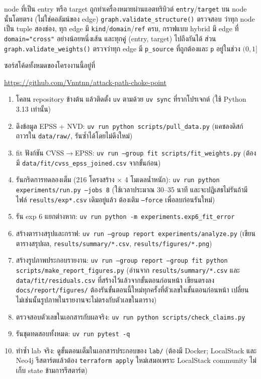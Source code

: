 \newpage
node ที่เป็น entry หรือ target ถูกทำเครื่องหมายผ่านแอตทริบิวต์ \texttt{entry}/\texttt{target}
บน node นั้นโดยตรง (ไม่ใช่คอลัมน์ของ edge) \texttt{graph.validate\_structure()} ตรวจสอบ
ว่าทุก node เป็น tuple สองช่อง, ทุก edge มี \texttt{kind}/\texttt{domain}/\texttt{ref} ครบ,
กราฟแบบ hybrid มี edge ที่ \texttt{domain="cross"} อย่างน้อยหนึ่งเส้น และทุกคู่
(entry, target) ไปถึงกันได้ ส่วน \texttt{graph.validate\_weights()} ตรวจว่าทุก edge มี
\texttt{p\_source} ที่ถูกต้องและ \texttt{p} อยู่ในช่วง $(0,1]$


ซอร์สโค้ดทั้งหมดของโครงงานนี้อยู่ที่

\begin{center}\scriptsize
\url{https://github.com/Vnntnn/attack-path-choke-point}
\end{center}

\begin{enumerate}[leftmargin=1.6em]
\item โคลน repository ข้างต้น แล้วติดตั้ง \texttt{uv} ตามด้วย \texttt{uv sync} ที่รากโปรเจกต์ (ใช้ Python 3.13 เท่านั้น)
\item ดึงข้อมูล EPSS + NVD: \texttt{uv run python scripts/pull\_data.py} (แคชลงดิสก์
ถาวรใน \texttt{data/raw/}, รันซ้ำได้โดยไม่ดึงใหม่)
\item fit ฟังก์ชัน CVSS$\to$EPSS: \texttt{uv run --group fit scripts/fit\_weights.py}
(ต้องมี \texttt{data/fit/cvss\_epss\_joined.csv} จากขั้นก่อน)
\item รันกริดการทดลองเต็ม (216 โครงสร้าง $\times$ 4 โมเดลน้ำหนัก):
\texttt{uv run python experiments/run.py --jobs 8} (ใช้เวลาประมาณ 30--35 นาที
และจะปฏิเสธไม่รันถ้ามีไฟล์ \texttt{results/exp*.csv} เดิมอยู่แล้ว ต้องเติม
\texttt{--force} เพื่อลบก่อนรันใหม่)
\item รัน exp 6 แยกต่างหาก: \texttt{uv run python -m experiments.exp6\_fit\_error}
\item สร้างตารางสรุปและกราฟ: \texttt{uv run --group report experiments/analyze.py}
(เขียนตารางสรุปผล, \texttt{results/summary/*.csv},
\texttt{results/figures/*.png})
\item สร้างรูปภาพประกอบรายงาน: \texttt{uv run --group report --group fit
python scripts/make\_report\_figures.py} (อ่านจาก \texttt{results/summary/*.csv}
และ \texttt{data/fit/residuals.csv} ที่สร้างไว้แล้วจากขั้นตอนก่อนหน้า เขียนตรงลง
\texttt{docs/report/figures/} ต้องรันขั้นตอนนี้ใหม่ทุกครั้งที่ตัวเลขในขั้นตอนก่อนหน้า
เปลี่ยน ไม่เช่นนั้นรูปภาพในรายงานจะไม่ตรงกับตัวเลขในตาราง)
\item ตรวจสอบตัวเลขในเอกสารกับผลจริง: \texttt{uv run python scripts/check\_claims.py}
\item รันชุดทดสอบทั้งหมด: \texttt{uv run pytest -q}
\item ทำซ้ำ lab จริง: ดูขั้นตอนเต็มในเอกสารประกอบของ \texttt{lab/} (ต้องมี Docker; LocalStack
และ Neo4j รีสตาร์ตแล้วต้อง \texttt{terraform apply} ใหม่เสมอเพราะ LocalStack community
ไม่เก็บ state ข้ามการรีสตาร์ต)
\end{enumerate}

